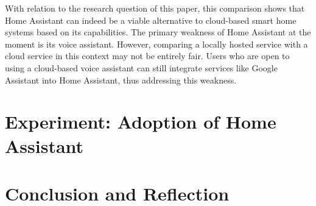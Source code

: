 \newpage

With relation to the research question of this paper, this comparison shows that Home Assistant can indeed be a viable alternative to cloud-based smart home systems based on its capabilities. The primary weakness of Home Assistant at the moment is its voice assistant. However, comparing a locally hosted service with a cloud service in this context may not be entirely fair. Users who are open to using a cloud-based voice assistant can still integrate services like Google Assistant into Home Assistant, thus addressing this weakness.


\section{Experiment: Adoption of Home Assistant}
\newpage


\section{Conclusion and Reflection}

